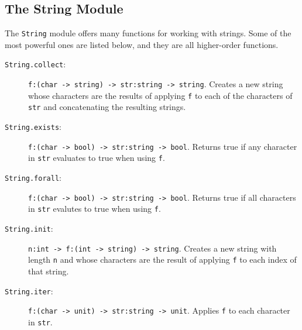 \documentclass[fsharpnotes.tex]{subfiles}
\begin{document}
\subsection{The String Module}
The \lstinline{String} module offers many functions for working with strings. Some of the most powerful ones are listed below, and they are all higher-order functions.
\begin{description}
\item[\texttt{String.collect}:] \lstinline{f:(char -> string) -> str:string -> string}. Creates a new string whose characters are the results of applying \lstinline{f} to each of the characters of \lstinline{str} and concatenating the resulting strings.
 \item[\texttt{String.exists}:] \lstinline{f:(char -> bool) -> str:string -> bool}. Returns true if any character in \lstinline{str} evaluates to true when using \lstinline{f}.
 \item[\texttt{String.forall}:] \lstinline{f:(char -> bool) -> str:string -> bool}. Returns true if all characters in \lstinline{str} evalutes to true when using \lstinline{f}.
\item[\texttt{String.init}:] \lstinline{n:int -> f:(int -> string) -> string}. Creates a new string with length \lstinline{n} and whose characters are the result of applying \lstinline{f} to each index of that string.
\item[\texttt{String.iter}:] \lstinline{f:(char -> unit) -> str:string -> unit}. Applies \lstinline{f} to each character in \lstinline{str}.

\end{description}
\end{document}
